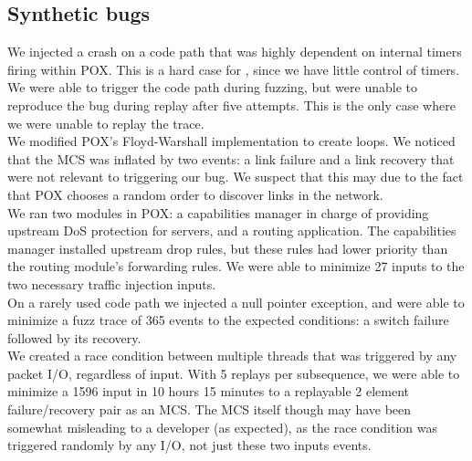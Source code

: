 \subsection{Synthetic bugs}
%
We injected a crash on a code path that was highly dependent on
internal timers firing within POX. This is a
hard case for \projectname, since we have little control of timers.
We were able to trigger the code path during fuzzing, but were unable to
reproduce the bug during replay after five attempts. %
This is the only case where we were
unable to replay the trace.\\[0.5ex]
%
We modified POX's Floyd-Warshall implementation to create loops.
We noticed that the MCS was inflated by two events: a link failure
and a link recovery that were not relevant to triggering our bug.
We suspect that this may due to the fact that POX chooses a random order to
discover links in the network.\\[0.5ex]
%
We ran two modules in POX: a capabilities manager in charge of providing
upstream DoS protection for servers, and a routing application. The
capabilities manager installed upstream drop rules, but these rules had lower priority
than the routing module's forwarding
rules. We were able to minimize 27 inputs to the two necessary traffic injection
inputs.\\[0.5ex]
%
On a rarely used code path we injected a null pointer exception,
and were able to minimize a fuzz trace of 365 events to the
expected conditions: a switch failure followed
by its recovery.\\[0.5ex]
%
We created a race condition between multiple threads that was
triggered by any packet I/O, regardless of input. With 5 replays per
subsequence, we were able to minimize a 1596 input in 10 hours 15 minutes to a
replayable 2 element failure/recovery pair as an MCS.
The MCS itself though may have been somewhat misleading to a developer (as
expected), as the race condition
was triggered randomly by any I/O, not just these two
inputs events.\\[0.5ex]
